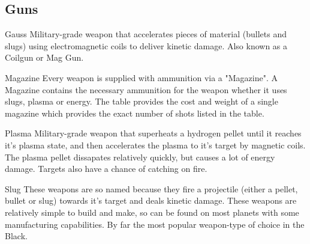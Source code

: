 \subsection{Guns}

\begin{multicols}{2}

\begin{genericsection}{Gauss}
Military-grade weapon that accelerates pieces of material (bullets and slugs) using electromagnetic coils to deliver kinetic damage. Also known as a Coilgun or Mag Gun.
\end{genericsection}

\begin{genericsection}{Magazine}
Every weapon is supplied with ammunition via a "Magazine". A Magazine contains the necessary ammunition for the weapon whether it uses slugs, plasma or energy. The table provides the cost and weight of a single magazine which provides the exact number of shots listed in the table.
\end{genericsection}

\begin{genericsection}{Plasma}
Military-grade weapon that superheats a hydrogen pellet until it reaches it's plasma state, and then accelerates the plasma to it's target by magnetic coils. The plasma pellet dissapates relatively quickly, but causes a lot of energy damage. Targets also have a chance of catching on fire.
\end{genericsection}

\begin{genericsection}{Slug}
These weapons are so named because they fire a projectile (either a pellet, bullet or slug) towards it's target and deals kinetic damage. These weapons are relatively simple to build and make, so can be found on most planets with some manufacturing capabilities. By far the most popular weapon-type of choice in the Black.
\end{genericsection}

\end{multicols}

